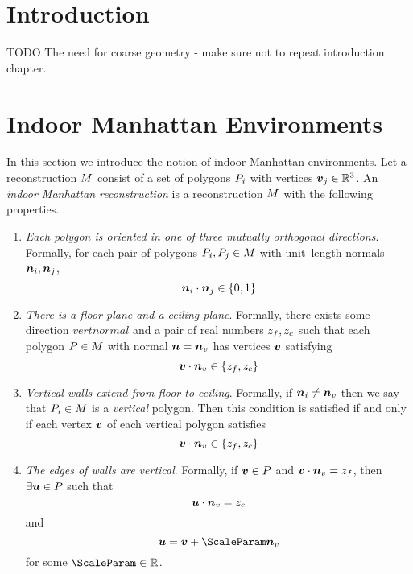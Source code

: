 \section{Introduction}

TODO
The need for coarse geometry - make sure not to repeat introduction chapter.

\section{Indoor Manhattan Environments}

In this section we introduce the notion of indoor Manhattan
environments. Let a reconstruction $\Reconstruction$ consist of a set
of polygons $\Poly_i$ with vertices $\vertex_j\in\Rthree$. An
\textit{indoor Manhattan reconstruction} is a reconstruction
$\Reconstruction$ with the following properties.
\begin{enumerate}
\item{\textit{Each polygon is oriented in one of three mutually
    orthogonal directions}. Formally, for each pair of polygons
  $\Poly_i,\Poly_j \in \Reconstruction$ with unit--length normals
  $\normal_i,\normal_j$,
  \begin{equation}
    \normal_i \cdot \normal_j \in \{0,1\}
  \end{equation}
}
\item{\textit{There is a floor plane and a ceiling plane}. Formally,
  there exists some direction $vertnormal$ and a pair of real
  numbers $\zfloor, \zceil$ such that each polygon
  $P\in\Reconstruction$ with normal $\normal=\vertnormal$ has
  vertices $\vertex$ satisfying
  \begin{equation}
    \vertex \cdot \vertnormal \in \{\zfloor, \zceil\}
  \end{equation}
}
\item{\textit{Vertical walls extend from floor to ceiling}. Formally, if
  $\normal_i \neq \vertnormal$ then we say that $\Poly_i \in
  \Reconstruction$ is a \textit{vertical} polygon. Then this
  condition is satisfied if and only if each vertex $\vertex$ of
  each vertical polygon satisfies
  \begin{equation}
    \vertex \cdot \vertnormal \in \{\zfloor, \zceil\}
  \end{equation}
}
\item{\textit{The edges of walls are vertical}. Formally, if
  $\vertex\in\Poly$ and $\vertex\cdot\vertnormal=\zfloor$, then
  $\exists\othervertex\in\Poly$ such that
  \begin{equation}
    \othervertex \cdot \vertnormal = \zceil
  \end{equation}
  and
  \begin{equation}
    \othervertex = \vertex + \ScaleParam \vertnormal
  \end{equation}
  for some $\ScaleParam \in \Reals$.
}
\end{enumerate}

